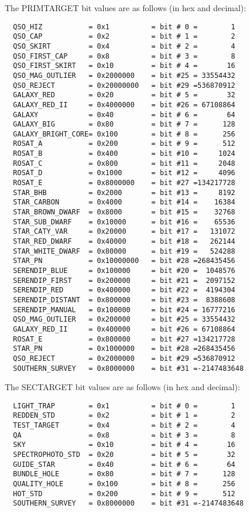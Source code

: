 \documentclass[12pt,preprint]{aastex}
\begin{document}
The PRIMTARGET bit values are as follows (in hex and decimal):
\begin{verbatim}
  QSO_HIZ           = 0x1          = bit # 0 =        1
  QSO_CAP           = 0x2          = bit # 1 =        2
  QSO_SKIRT         = 0x4          = bit # 2 =        4
  QSO_FIRST_CAP     = 0x8          = bit # 3 =        8
  QSO_FIRST_SKIRT   = 0x10         = bit # 4 =       16
  QSO_MAG_OUTLIER   = 0x2000000    = bit #25 = 33554432
  QSO_REJECT        = 0x20000000   = bit #29 =536870912
  GALAXY_RED        = 0x20         = bit # 5 =       32
  GALAXY_RED_II     = 0x4000000    = bit #26 = 67108864
  GALAXY            = 0x40         = bit # 6 =       64
  GALAXY_BIG        = 0x80         = bit # 7 =      128
  GALAXY_BRIGHT_CORE= 0x100        = bit # 8 =      256
  ROSAT_A           = 0x200        = bit # 9 =      512
  ROSAT_B           = 0x400        = bit #10 =     1024
  ROSAT_C           = 0x800        = bit #11 =     2048
  ROSAT_D           = 0x1000       = bit #12 =     4096
  ROSAT_E           = 0x8000000    = bit #27 =134217728
  STAR_BHB          = 0x2000       = bit #13 =     8192
  STAR_CARBON       = 0x4000       = bit #14 =    16384
  STAR_BROWN_DWARF  = 0x8000       = bit #15 =    32768
  STAR_SUB_DWARF    = 0x10000      = bit #16 =    65536
  STAR_CATY_VAR     = 0x20000      = bit #17 =   131072
  STAR_RED_DWARF    = 0x40000      = bit #18 =   262144
  STAR_WHITE_DWARF  = 0x80000      = bit #19 =   524288
  STAR_PN           = 0x10000000   = bit #28 =268435456
  SERENDIP_BLUE     = 0x100000     = bit #20 =  1048576
  SERENDIP_FIRST    = 0x200000     = bit #21 =  2097152
  SERENDIP_RED      = 0x400000     = bit #22 =  4194304
  SERENDIP_DISTANT  = 0x800000     = bit #23 =  8388608
  SERENDIP_MANUAL   = 0x100000     = bit #24 = 16777216
  QSO_MAG_OUTLIER   = 0x200000     = bit #25 = 33554432
  GALAXY_RED_II     = 0x400000     = bit #26 = 67108864
  ROSAT_E           = 0x800000     = bit #27 =134217728
  STAR_PN           = 0x1000000    = bit #28 =268435456
  QSO_REJECT        = 0x2000000    = bit #29 =536870912
  SOUTHERN_SURVEY   = 0x8000000    = bit #31 =-2147483648
\end{verbatim}

The SECTARGET bit values are as follows (in hex and decimal):
\begin{verbatim}
  LIGHT_TRAP        = 0x1          = bit # 0 =        1
  REDDEN_STD        = 0x2          = bit # 1 =        2
  TEST_TARGET       = 0x4          = bit # 2 =        4
  QA                = 0x8          = bit # 3 =        8
  SKY               = 0x10         = bit # 4 =       16
  SPECTROPHOTO_STD  = 0x20         = bit # 5 =       32
  GUIDE_STAR        = 0x40         = bit # 6 =       64
  BUNDLE_HOLE       = 0x80         = bit # 7 =      128
  QUALITY_HOLE      = 0x100        = bit # 8 =      256
  HOT_STD           = 0x200        = bit # 9 =      512
  SOUTHERN_SURVEY   = 0x8000000    = bit #31 =-2147483648
\end{verbatim}
\end{document}
